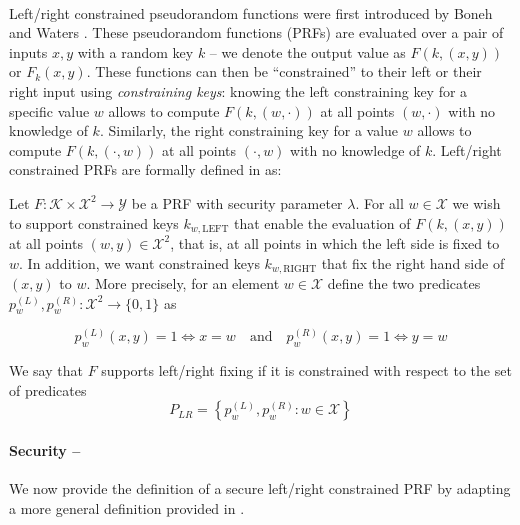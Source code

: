 \paragraph{} Left/right constrained pseudorandom functions were first introduced by Boneh and Waters \cite{LRPRF}. These pseudorandom functions (PRFs) are evaluated over a pair of inputs $x,y$ with a random key $k$ -- we denote the output value as $F(k, (x,y))$ or $F_k(x,y)$. These functions can then be ``constrained'' to their left or their right input using \textit{constraining keys}: knowing the left constraining key for a specific value $w$ allows to compute $F(k, (w,\cdot))$ at all points $(w, \cdot)$ with no knowledge of $k$. Similarly, the right constraining key for a value $w$ allows to compute $F(k, (\cdot,w))$ at all points $(\cdot,w)$ with no knowledge of $k$. Left/right constrained PRFs are formally defined in \cite{LRPRF} as:

\begin{definition}
	Let $F: \mathcal{K} \times \mathcal{X}^2 \rightarrow \mathcal{Y}$ be a PRF with security parameter $\lambda$. For all $w \in \mathcal{X}$ we wish to support constrained keys $k_{w, \mathrm{LEFT}}$ that enable the evaluation of $F(k, (x,y))$ at all points $(w,y)\in \mathcal{X}^2$, that is, at all points in which the left side is fixed to $w$. In addition, we want constrained keys $k_{w,\mathrm{RIGHT}}$ that fix the right hand side of $(x,y)$ to $w$. More precisely, for an element $w \in \mathcal{X}$ define the two predicates $p_w^{(L)}, p_w^{(R)}: \mathcal{X}^2 \rightarrow \{0,1\}$ as
	
	$$
		p_w^{(L)}(x,y) = 1 \iff x = w \quad \mathrm{and} \quad p_w^{(R)}(x,y) = 1 \iff y = w 
	$$
	
	We say that $F$ supports left/right fixing if it is constrained with respect to the set of predicates
	$$
		P_{LR}=\left\{ p_w^{(L)}, p_w^{(R)}: w\in \mathcal{X} \right\}
	$$
	
\end{definition}

\paragraph{Security -- } We now provide the definition of a secure left/right constrained PRF by adapting a more general definition provided in \cite{LRPRF}.

